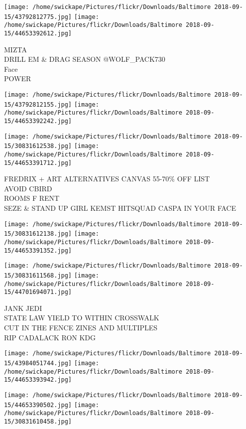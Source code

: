 \documentclass[10pt,letterpaper]{article}
\begin{document}
\texttt{[image: /home/swickape/Pictures/flickr/Downloads/Baltimore 2018-09-15/43792812775.jpg]}
\texttt{[image: /home/swickape/Pictures/flickr/Downloads/Baltimore 2018-09-15/44653392612.jpg]}

MIZTA\\
DRILL EM \& DRAG SEASON @WOLF\_PACK730\\
Face\\
POWER
\pagebreak

\texttt{[image: /home/swickape/Pictures/flickr/Downloads/Baltimore 2018-09-15/43792812155.jpg]}
\texttt{[image: /home/swickape/Pictures/flickr/Downloads/Baltimore 2018-09-15/44653392242.jpg]}

\texttt{[image: /home/swickape/Pictures/flickr/Downloads/Baltimore 2018-09-15/30831612538.jpg]}
\texttt{[image: /home/swickape/Pictures/flickr/Downloads/Baltimore 2018-09-15/44653391712.jpg]}

FREDRIX + ART ALTERNATIVES CANVAS 55{-}70\% OFF LIST\\
AVOID CBIRD\\
ROOMS F RENT\\
SEZE \& STAND UP GIRL KEMST HITSQUAD CASPA IN YOUR FACE
\pagebreak

\texttt{[image: /home/swickape/Pictures/flickr/Downloads/Baltimore 2018-09-15/30831612138.jpg]}
\texttt{[image: /home/swickape/Pictures/flickr/Downloads/Baltimore 2018-09-15/44653391352.jpg]}

\texttt{[image: /home/swickape/Pictures/flickr/Downloads/Baltimore 2018-09-15/30831611568.jpg]}
\texttt{[image: /home/swickape/Pictures/flickr/Downloads/Baltimore 2018-09-15/44701694071.jpg]}

JANK JEDI\\
STATE LAW YIELD TO WITHIN CROSSWALK\\
CUT IN THE FENCE ZINES AND MULTIPLES\\
RIP CADALACK RON KDG
\pagebreak

\texttt{[image: /home/swickape/Pictures/flickr/Downloads/Baltimore 2018-09-15/43984051744.jpg]}
\texttt{[image: /home/swickape/Pictures/flickr/Downloads/Baltimore 2018-09-15/44653393942.jpg]}

\texttt{[image: /home/swickape/Pictures/flickr/Downloads/Baltimore 2018-09-15/44653390502.jpg]}
\texttt{[image: /home/swickape/Pictures/flickr/Downloads/Baltimore 2018-09-15/30831610458.jpg]}
\end{document}
